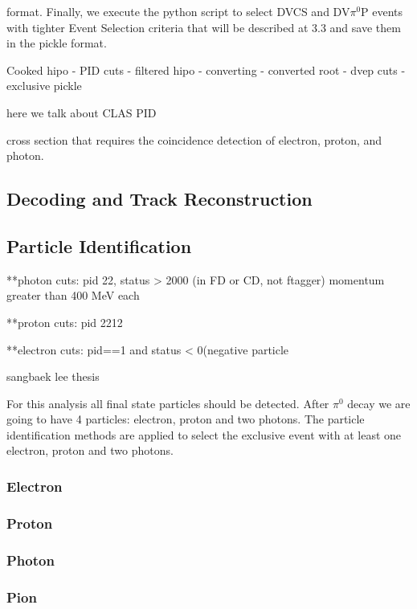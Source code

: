 format. Finally, we execute the python script to select DVCS and DV$\pi^0$P events with tighter Event Selection criteria that will be described at 3.3 and save them in the pickle format.



Cooked hipo - PID cuts - filtered hipo - converting - converted root - dvep cuts - exclusive pickle





here we talk about CLAS PID




cross section that requires the coincidence detection of electron, proton,
and photon.

\subsection{Decoding and Track Reconstruction}\label{sec:decrec}

\subsection{Particle Identification}
**photon cuts:
pid 22, status > 2000 (in FD or CD, not ftagger)
momentum greater than 400 MeV each

**proton cuts: pid 2212

**electron cuts: pid==1 and status < 0(negative particle

sangbaek lee thesis \parencite{Lee2022MeasurementDetector}

For this analysis all final state particles should be detected.
After $\pi^0$ decay we are going to have 4 particles: electron, proton and two photons.
The particle identification methods are applied to select the exclusive event with at least one electron, proton and two photons. 


    \subsubsection{Electron}
    \subsubsection{Proton}
    \subsubsection{Photon}
    \subsubsection{Pion}
    
